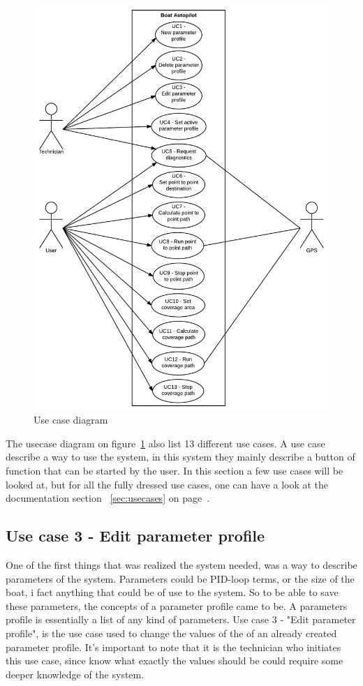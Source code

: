 \begin{figure}[h]
\centering
\includegraphics[width=0.7\linewidth]{../Appendix/Project/Dokumentation/Images/Requirements_specification/Usecase_diagram}
\caption{Use case diagram}
\label{fig:usecasediagram}
\end{figure}

The usecase diagram on figure~\ref{fig:usecasediagram} also list 13 different use cases. A use case describe a way to use the system, in this system they mainly describe a button of function that can be started by the user. In this section a few use cases will be looked at, but for all the fully dressed use cases, one can have a look at the documentation section ~\ref{sec:usecases} on page~\pageref{sec:usecases}.

\subsection{Use case 3 - Edit parameter profile}
One of the first things that was realized the system needed, was a way to describe parameters of the system. Parameters could be PID-loop terms, or the size of the boat, i fact anything that could be of use to the system. So to be able to save these parameters, the concepts of a parameter profile came to be. A parameters profile is essentially a list of any kind of parameters. Use case 3 - "Edit parameter profile", is the use case used to change the values of the of an already created parameter profile. It's important to note that it is the technician who initiates this use case, since know what exactly the values should be could require some deeper knowledge of the system. 

